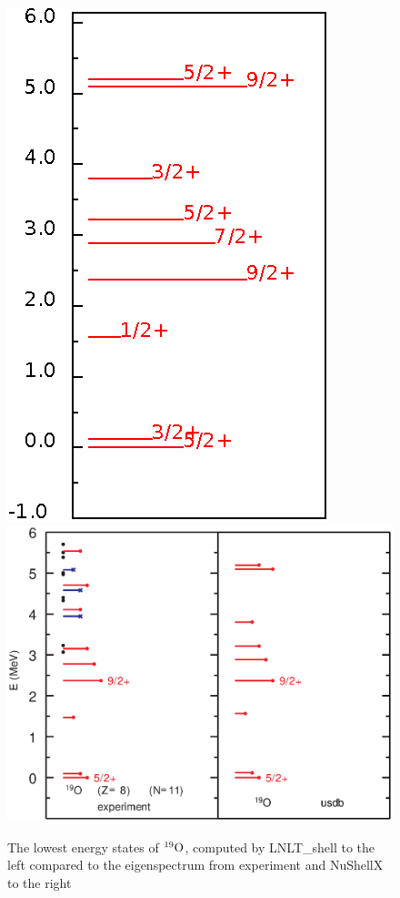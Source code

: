 \begin{figure}[h!]
\includegraphics{ox19.eps}
\includegraphics[scale=0.56,trim=0cm 2.3cm 0cm 0cm]{o_19b.eps}
\caption{The lowest energy states of $^{19}\rm{O}$, computed by LNLT\_shell to the left compared to the eigenspectrum from experiment and NuShellX to the right}
\label{fig:ox19eig}
\end{figure}

